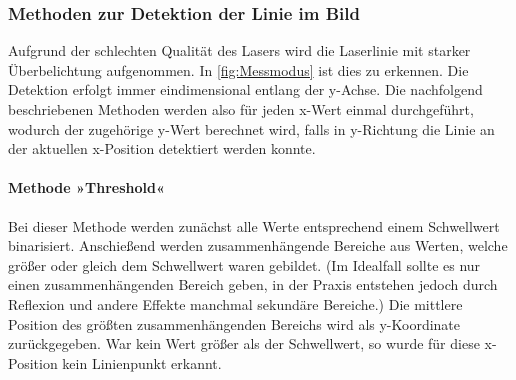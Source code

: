 \documentclass[a4paper,10pt]{scrartcl}
\begin{document}
\subsubsection{Methoden zur Detektion der Linie im Bild}

Aufgrund der schlechten Qualität des Lasers wird die Laserlinie mit starker Überbelichtung aufgenommen.
In \cref{fig:Messmodus} ist dies zu erkennen. Die Detektion erfolgt immer eindimensional entlang der y-Achse. Die
nachfolgend beschriebenen Methoden werden also für jeden x-Wert einmal durchgeführt, wodurch der zugehörige
y-Wert berechnet wird, falls in y-Richtung die Linie an der aktuellen x-Position detektiert werden konnte.

\paragraph{Methode »Threshold«}

Bei dieser Methode werden zunächst alle Werte entsprechend einem Schwellwert binarisiert. Anschießend
werden zusammenhängende Bereiche aus Werten, welche größer oder gleich dem Schwellwert waren gebildet.
(Im Idealfall sollte es nur einen zusammenhängenden Bereich geben, in der Praxis entstehen jedoch durch
Reflexion und andere Effekte manchmal sekundäre Bereiche.) Die mittlere Position des größten
zusammenhängenden Bereichs wird als y-Koordinate zurückgegeben. War kein Wert größer als
der Schwellwert, so wurde für diese x-Position kein Linienpunkt erkannt.
\end{document}
